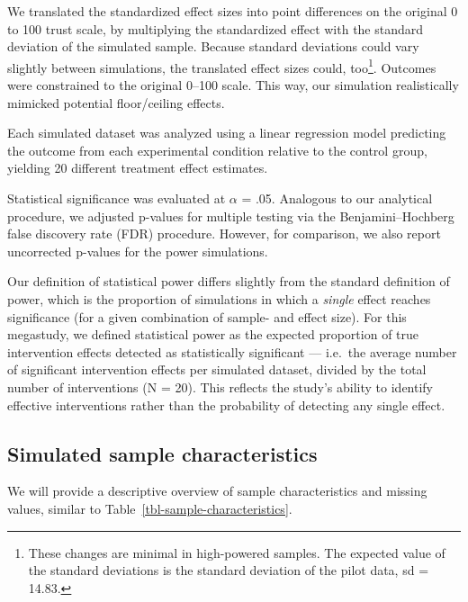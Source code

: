\documentclass[
  letterpaper,
  DIV=11,
  numbers=noendperiod]{scrartcl}
\begin{document}
We translated the standardized effect sizes into point differences on
the original 0 to 100 trust scale, by multiplying the standardized
effect with the standard deviation of the simulated sample. Because
standard deviations could vary slightly between simulations, the
translated effect sizes could, too\footnote{These changes are minimal in
  high-powered samples. The expected value of the standard deviations is
  the standard deviation of the pilot data, sd = 14.83.}. Outcomes were
constrained to the original 0--100 scale. This way, our simulation
realistically mimicked potential floor/ceiling effects.

Each simulated dataset was analyzed using a linear regression model
predicting the outcome from each experimental condition relative to the
control group, yielding 20 different treatment effect estimates.

Statistical significance was evaluated at \(\alpha\) = .05. Analogous to
our analytical procedure, we adjusted p-values for multiple testing via
the Benjamini--Hochberg false discovery rate (FDR) procedure. However,
for comparison, we also report uncorrected p-values for the power
simulations.

Our definition of statistical power differs slightly from the standard
definition of power, which is the proportion of simulations in which a
\emph{single} effect reaches significance (for a given combination of
sample- and effect size). For this megastudy, we defined statistical
power as the expected proportion of true intervention effects detected
as statistically significant --- i.e.~the average number of significant
intervention effects per simulated dataset, divided by the total number
of interventions (N = 20). This reflects the study's ability to identify
effective interventions rather than the probability of detecting any
single effect.

\subsection{Simulated sample
characteristics}\label{simulated-sample-characteristics}

We will provide a descriptive overview of sample characteristics and
missing values, similar to Table~\ref{tbl-sample-characteristics}.

\begingroup\fontsize{9}{11}\selectfont
\end{document}
